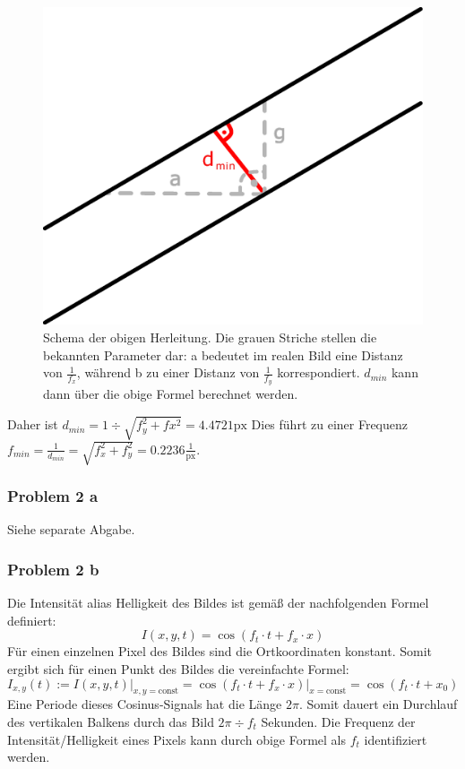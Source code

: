\begin{figure}[h]
    \captionsetup{width=0.8\columnwidth}
    \centering
    \includegraphics[width=.4\columnwidth]{ue5/Dmin.eps}
    \caption{Schema der obigen Herleitung. Die grauen Striche stellen die bekannten Parameter dar: a bedeutet im realen Bild eine Distanz von $\frac{1}{f_x}$, während b zu einer Distanz von $\frac{1}{f_y}$ korrespondiert. $d_{min}$ kann dann über die obige Formel berechnet werden.}
    \label{fig:Dmin}
\end{figure}

Daher ist $d_{min} = 1 \div \sqrt{f_y^2+fx^2} = 4.4721 \text{px}$ Dies führt zu einer Frequenz $f_{min} = \frac{1}{d_{min}} = \sqrt{f_x^2+f_y^2} = 0.2236 \frac{1}{\text{px}}$.

\subsubsection{Problem 2 a}

Siehe separate Abgabe.


\subsubsection{Problem 2 b}

Die Intensität alias Helligkeit des Bildes ist gemäß der nachfolgenden Formel definiert:
$$I(x,y,t) = \cos( f_t \cdot t + f_x \cdot x)$$
Für einen einzelnen Pixel des Bildes sind die Ortkoordinaten konstant. Somit ergibt sich für einen Punkt des Bildes die vereinfachte Formel:
$$I_{x,y}(t) := I(x,y,t) \big|_{x,y = \text{const}} = \cos(f_t \cdot t + f_x \cdot x) \big|_{x=\text{const}} = \cos(f_t \cdot t + x_0)$$
Eine Periode dieses Cosinus-Signals hat die Länge $2 \pi$. Somit dauert ein Durchlauf des vertikalen Balkens durch das Bild $2\pi \div f_t$ Sekunden. Die Frequenz der Intensität/Helligkeit eines Pixels kann durch obige Formel als $f_t$ identifiziert werden.

